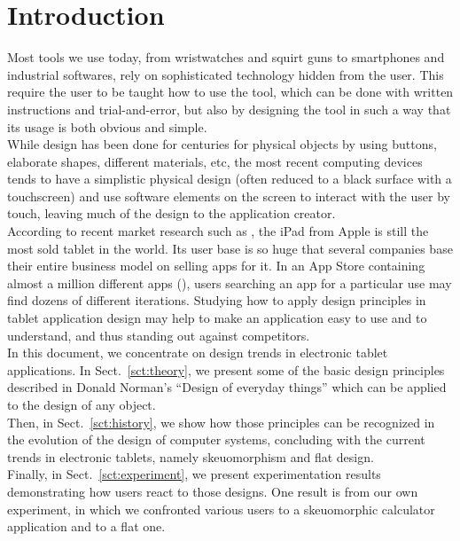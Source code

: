 \documentclass[a4paper,11pt] {article}
\theoremstyle{definition}
\begin{document}
\pagebreak

\tableofcontents
\pagebreak

\section{Introduction}

Most tools we use today, from wristwatches and squirt guns to smartphones and industrial softwares, rely on sophisticated technology hidden from the user. This require the user to be taught how to use the tool, which can be done with written instructions and trial-and-error, but also by designing the tool in such a way that its usage is both obvious and simple.\\

While design has been done for centuries for physical objects by using buttons, elaborate shapes, different materials, etc, the most recent computing devices tends to have a simplistic physical design (often reduced to a black surface with a touchscreen) and use software elements on the screen to interact with the user by touch, leaving much of the design to the application creator.\\

According to recent market research such as \cite{ABI-android}, the iPad from Apple is still the most sold tablet in the world. Its user base is so huge that several companies base their entire business model on selling apps for it. In an App Store containing almost a million different apps (\cite{iOs61}), users searching an app for a particular use may find dozens of different iterations. Studying how to apply design principles in tablet application design may help to make an application easy to use and to understand, and thus standing out against competitors.\\

In this document, we concentrate on design trends in electronic tablet applications. In Sect.~\ref{sct:theory}, we present some of the basic design principles described in Donald Norman's ``Design of everyday things'' \cite{Norman02} which can be applied to the design of any object.\\

Then, in Sect.~\ref{sct:history}, we show how those principles can be recognized in the evolution of the design of computer systems, concluding with the current trends in electronic tablets, namely skeuomorphism and flat design.\\

Finally, in Sect.~\ref{sct:experiment}, we present experimentation results demonstrating how users react to those designs. One result is from our own experiment, in which we confronted various users to a skeuomorphic calculator application and to a flat one.\\
\end{document}
